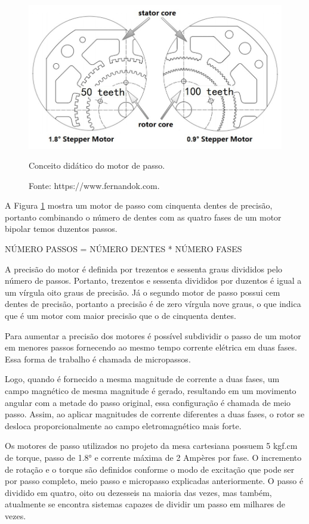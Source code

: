 \begin{figure}[!htb]
\centering
\includegraphics[scale = 0.4]{figuras/3-15}
\caption{Conceito didático do motor de passo.}
\caption*{Fonte: https://www.fernandok.com.}
\label{fig:didaticopasso}
\end{figure}
    
A Figura \ref{fig:didaticopasso} mostra um motor de passo com cinquenta dentes de precisão, portanto combinando 
o número de dentes com as quatro fases de um motor bipolar temos duzentos passos.

NÚMERO PASSOS = NÚMERO DENTES * NÚMERO FASES

A precisão do motor é definida por trezentos e sessenta graus divididos pelo número de passos. Portanto, 
trezentos e sessenta divididos por duzentos é igual a um vírgula oito graus de precisão. Já o segundo motor 
de passo possui cem dentes de precisão, portanto a precisão é de zero vírgula nove graus, o que indica que 
é um motor com maior precisão que o de cinquenta dentes.

Para aumentar a precisão dos motores é possível subdividir o passo de um motor em menores passos fornecendo 
ao mesmo tempo corrente elétrica em duas fases. Essa forma de trabalho é chamada de micropassos.

Logo, quando é fornecido a mesma magnitude de corrente a duas fases, um campo magnético de mesma magnitude 
é gerado, resultando em um movimento angular com a metade do passo original, essa configuração é chamada de 
meio passo. Assim, ao aplicar magnitudes de corrente diferentes a duas fases, o rotor se desloca 
proporcionalmente ao campo eletromagnético mais forte.

Os motores de passo utilizados no projeto da mesa cartesiana possuem 5 kgf.cm de torque, passo de 1.8° e 
corrente máxima de 2 Ampères por fase. O incremento de rotação e o torque são definidos conforme o modo 
de excitação que pode ser por passo completo, meio passo e micropasso explicadas anteriormente. O passo 
é dividido em quatro, oito ou dezesseis na maioria das vezes, mas também, atualmente se encontra 
sistemas capazes de  dividir um passo em milhares de vezes.

